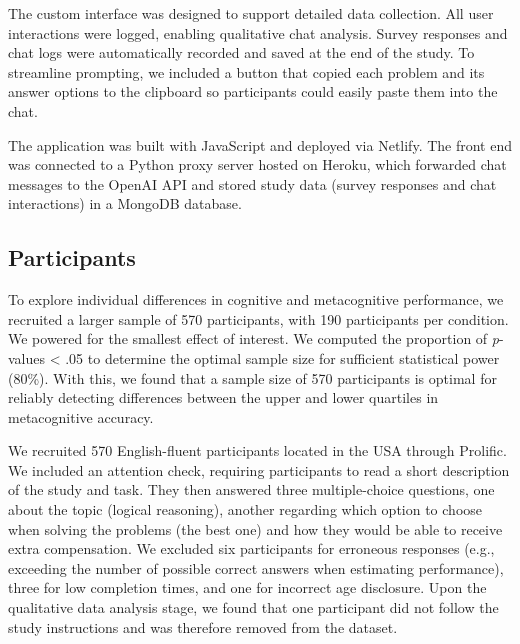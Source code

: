 \documentclass[manuscript, anonymous=false,authorversion,review=false]{acmart}
\begin{document}
The custom interface was designed to support detailed data collection. All user interactions were logged, enabling qualitative chat analysis. Survey responses and chat logs were automatically recorded and saved at the end of the study. To streamline prompting, we included a button that copied each problem and its answer options to the clipboard so participants could easily paste them into the chat.

The application was built with JavaScript and deployed via Netlify. The front end was connected to a Python proxy server hosted on Heroku, which forwarded chat messages to the OpenAI API and stored study data (survey responses and chat interactions) in a MongoDB database.


\subsection{Participants}
To explore individual differences in cognitive and metacognitive performance, we recruited a larger sample of 570 participants, with 190 participants per condition.
We powered for the smallest effect of interest. We computed the proportion of \textit{p}-values < .05 to determine the optimal sample size for sufficient statistical power (80\%). With this, we found that a sample size of 570 participants is optimal for reliably detecting differences between the upper and lower quartiles in metacognitive accuracy.

We recruited 570 English-fluent participants located in the USA through Prolific. We included an attention check, requiring participants to read a short description of the study and task. They then answered three multiple-choice questions, one about the topic (logical reasoning), another regarding which option to choose when solving the problems (the best one) and how they would be able to receive extra compensation.
We excluded six participants for erroneous responses (e.g., exceeding the number of possible correct answers when estimating performance), three for low completion times, and one for incorrect age disclosure. %
Upon the qualitative data analysis stage, we found that one participant did not follow the study instructions and was therefore removed from the dataset.
\end{document}
